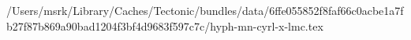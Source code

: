 /Users/msrk/Library/Caches/Tectonic/bundles/data/6ffe055852f8faf66c0acbe1a7fb27f87b869a90bad1204f3bf4d9683f597c7c/hyph-mn-cyrl-x-lmc.tex